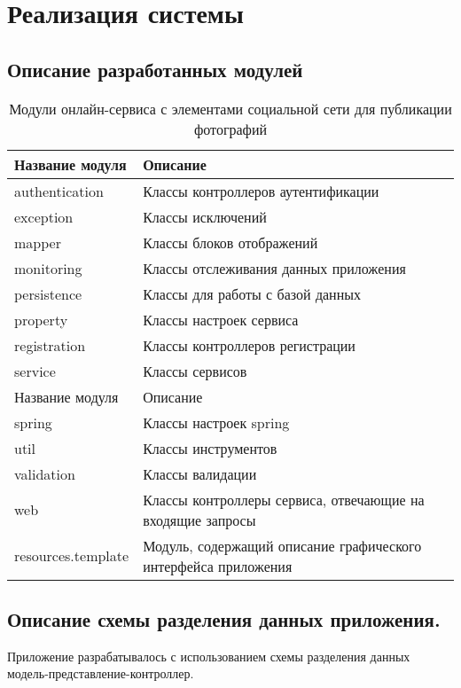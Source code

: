 \clearpage

\section{Реализация системы}
\subsection{Описание разработанных модулей}
\begin{table}[H]
  \caption{\onehalfspacing Модули онлайн-сервиса с элементами социальной сети для публикации фотографий}\label{user-classes-table}
  \begin{tabular}{|p{4cm}|p{12cm}|}
  \hline Название модуля & Описание \\ 
  \hline authentication & Классы контроллеров аутентификации \\ 
  \hline exception & Классы исключений \\ 
  \hline mapper & Классы блоков отображений \\ 
  \hline monitoring & Классы отслеживания данных приложения \\ 
  \hline persistence & Классы для работы с базой данных \\ 
  \hline property & Классы настроек сервиса \\ 
  \hline registration & Классы контроллеров регистрации \\ 
  \hline service & Классы сервисов \\ 
  \hline Название модуля & Описание \\ 
  \hline spring & Классы настроек spring \\ 
  \hline util & Классы инструментов \\ 
  \hline validation & Классы валидации \\ 
  \hline web & Классы контроллеры сервиса, отвечающие на входящие запросы \\ 
  \hline resources.template & Модуль, содержащий описание графического интерфейса приложения \\ 
  \hline
  \end{tabular}
\end{table}


\subsection{Описание схемы разделения данных приложения.}

Приложение разрабатывалось с использованием схемы разделения данных модель-представление-контроллер.

